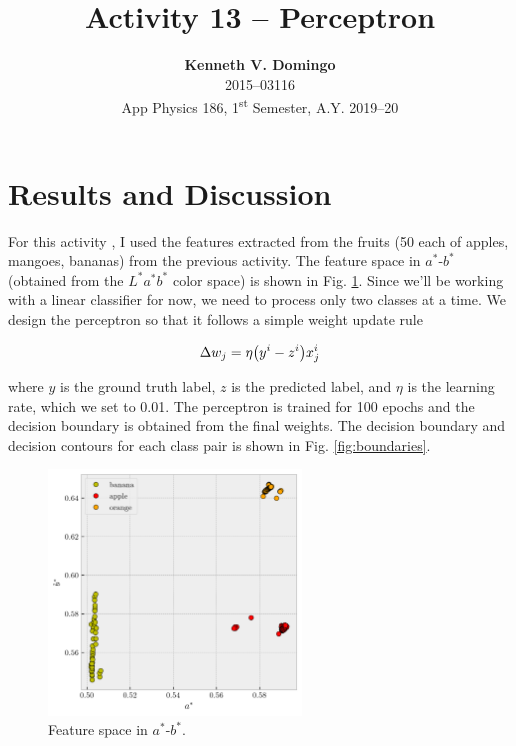 \documentclass[12pt,a4paper]{article}
\newcommand{\activity}{Activity 13 -- Perceptron}
\begin{document}
\title{\TitleFont \activity}
\author[ ]{\textbf{Kenneth V. Domingo} \\
2015--03116 \\
App Physics 186, 1\textsuperscript{st} Semester, A.Y. 2019--20}

\maketitle
\thispagestyle{titlestyle}

\section*{Results and Discussion}
\setcounter{section}{1}

For this activity \cite{soriano}, I used the features extracted from the fruits (50 each of apples, mangoes, bananas) from the previous activity. The feature space in $a^*$-$b^*$ (obtained from the $L^*a^*b^*$ color space) is shown in Fig. \ref{fig:ab-space}. Since we'll be working with a linear classifier for now, we need to process only two classes at a time. We design the perceptron so that it follows a simple weight update rule

\begin{equation}\label{eq:weight-update}
	\Delta w_j = \eta \qty(y^i - z^i)x_j^i
\end{equation}

\noindent where $y$ is the ground truth label, $z$ is the predicted label, and $\eta$ is the learning rate, which we set to 0.01. The perceptron is trained for 100 epochs and the decision boundary is obtained from the final weights. The decision boundary and decision contours for each class pair is shown in Fig. \ref{fig:boundaries}.

\begin{figure}[htb]
	\centering
	\includegraphics[width=0.6\textwidth]{ab-space.png}
	\caption{Feature space in $a^*$-$b^*$.}
	\label{fig:ab-space}
\end{figure}
\end{document}
